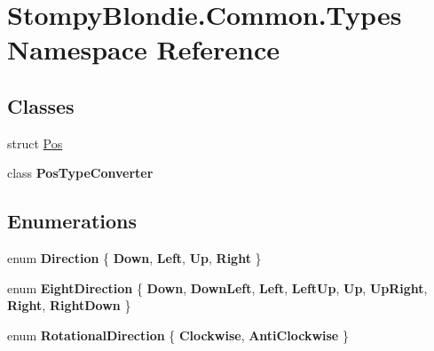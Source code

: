 \hypertarget{namespace_stompy_blondie_1_1_common_1_1_types}{}\section{Stompy\+Blondie.\+Common.\+Types Namespace Reference}
\label{namespace_stompy_blondie_1_1_common_1_1_types}
\subsection*{Classes}
\begin{DoxyCompactItemize}
\item 
struct \mbox{\hyperlink{struct_stompy_blondie_1_1_common_1_1_types_1_1_pos}{Pos}}
\item 
class {\bfseries Pos\+Type\+Converter}
\end{DoxyCompactItemize}
\subsection*{Enumerations}
\begin{DoxyCompactItemize}
\item 
\mbox{\label{namespace_stompy_blondie_1_1_common_1_1_types_a2477d455b973b989d248635a56ffbd25}} 
enum {\bfseries Direction} \{ {\bfseries Down}, 
{\bfseries Left}, 
{\bfseries Up}, 
{\bfseries Right}
 \}
\item 
\mbox{\label{namespace_stompy_blondie_1_1_common_1_1_types_a67d21ccf6a23cdea91c271cce76f920f}} 
enum {\bfseries Eight\+Direction} \{ \newline
{\bfseries Down}, 
{\bfseries Down\+Left}, 
{\bfseries Left}, 
{\bfseries Left\+Up}, 
\newline
{\bfseries Up}, 
{\bfseries Up\+Right}, 
{\bfseries Right}, 
{\bfseries Right\+Down}
 \}
\item 
\mbox{\label{namespace_stompy_blondie_1_1_common_1_1_types_aa8d41922aaa5f468ef8e2c8f8e083084}} 
enum {\bfseries Rotational\+Direction} \{ {\bfseries Clockwise}, 
{\bfseries Anti\+Clockwise}
 \}
\end{DoxyCompactItemize}
